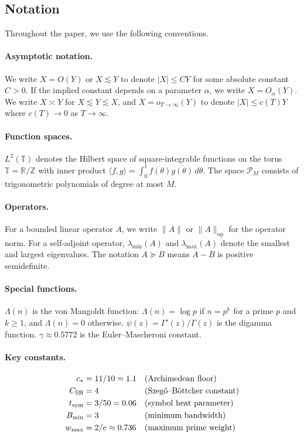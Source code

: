 \documentclass[11pt,a4paper]{article}
\theoremstyle{definition}
\theoremstyle{remark}
\newcommand{\R}{\mathbb{R}}
\newcommand{\Z}{\mathbb{Z}}
\newcommand{\T}{\mathbb{T}}
\begin{document}
\subsection{Notation}\label{subsec:notation}

Throughout the paper, we use the following conventions.

\paragraph{Asymptotic notation.}
We write $X = O(Y)$ or $X \lesssim Y$ to denote $|X| \leq CY$ for some absolute constant $C > 0$. If the implied constant depends on a parameter $\alpha$, we write $X = O_\alpha(Y)$. We write $X \asymp Y$ for $X \lesssim Y \lesssim X$, and $X = o_{T \to \infty}(Y)$ to denote $|X| \leq c(T) Y$ where $c(T) \to 0$ as $T \to \infty$.

\paragraph{Function spaces.}
$L^2(\T)$ denotes the Hilbert space of square-integrable functions on the torus $\T = \R/\Z$ with inner product $\langle f, g \rangle = \int_0^1 f(\theta) \overline{g(\theta)}\, d\theta$. The space $\mathcal{P}_M$ consists of trigonometric polynomials of degree at most $M$.

\paragraph{Operators.}
For a bounded linear operator $A$, we write $\|A\|$ or $\|A\|_{\mathrm{op}}$ for the operator norm. For a self-adjoint operator, $\lambda_{\min}(A)$ and $\lambda_{\max}(A)$ denote the smallest and largest eigenvalues. The notation $A \succeq B$ means $A - B$ is positive semidefinite.

\paragraph{Special functions.}
$\Lambda(n)$ is the von Mangoldt function: $\Lambda(n) = \log p$ if $n = p^k$ for a prime $p$ and $k \geq 1$, and $\Lambda(n) = 0$ otherwise. $\psi(z) = \Gamma'(z)/\Gamma(z)$ is the digamma function. $\gamma \approx 0.5772$ is the Euler--Mascheroni constant.

\paragraph{Key constants.}
\begin{align*}
  c_* &= 11/10 = 1.1 && \text{(Archimedean floor)} \\
  C_{\mathrm{SB}} &= 4 && \text{(Szeg\H{o}--B\"ottcher constant)} \\
  t_{\mathrm{sym}} &= 3/50 = 0.06 && \text{(symbol heat parameter)} \\
  B_{\min} &= 3 && \text{(minimum bandwidth)} \\
  w_{\max} &= 2/e \approx 0.736 && \text{(maximum prime weight)}
\end{align*}
\end{document}
